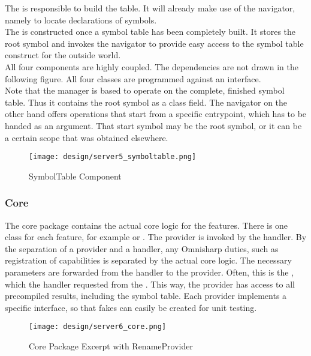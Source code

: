 The  is responsible to build the table.
It will already make use of the navigator, namely to locate declarations of symbols.\\

The  is constructed once a symbol table has been completely built.
It stores the root symbol and invokes the navigator to provide easy access to the symbol table construct for the outside world.\\

All four components are highly coupled.
The dependencies are not drawn in the following figure.
All four classes are programmed against an interface.\\

Note that the manager is based to operate on the complete, finished symbol table.
Thus it contains the root symbol as a class field.
The navigator on the other hand offers operations that start from a specific entrypoint, which has to be handed as an argument.
That start symbol may be the root symbol, or it can be a certain scope that was obtained elsewhere.


\begin{figure}[H]
    \centering
    \texttt{[image: design/server5\_symboltable.png]}
    \caption{SymbolTable Component}
    \label{fig:server_st}
\end{figure}

\subsubsection {Core}
The core package contains the actual core logic for the features.
There is one class for each feature, for example  or .
The provider is invoked by the handler.
By the separation of a provider and a handler, any Omnisharp duties, such as registration of capabilities is separated by the actual core logic.
The necessary parameters are forwarded from the handler to the provider.
Often, this is the , which the handler requested from the .
This way, the provider has access to all precompiled results, including the symbol table.
Each provider implements a specific interface, so that fakes can easily be created for unit testing.

\begin{figure}[H]
    \centering
    \texttt{[image: design/server6\_core.png]}
    \caption{Core Package Excerpt with RenameProvider}
    \label{fig:server_core}
\end{figure}

